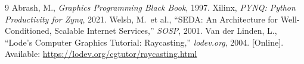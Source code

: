 \begin{thebibliography}{9}
\small
{} Abrash, M., \textit{Graphics Programming Black Book}, 1997.
 Xilinx, \textit{PYNQ: Python Productivity for Zynq}, 2021.
 Welsh, M.\ et al., ``SEDA: An Architecture for Well-Conditioned, Scalable Internet Services,'' \textit{SOSP}, 2001.
 Van der Linden, L., ``Lode's Computer Graphics Tutorial: Raycasting,'' \textit{lodev.org}, 2004. [Online]. Available: \url{https://lodev.org/cgtutor/raycasting.html}

\end{thebibliography}